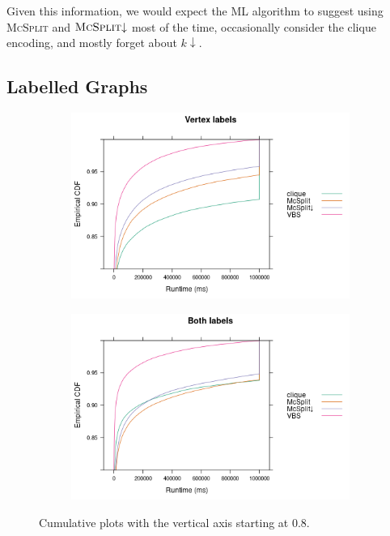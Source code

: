 \documentclass{l4proj}
\theoremstyle{definition}
\theoremstyle{remark}
\begin{document}
Given this information, we would expect the ML algorithm to suggest using
\textsc{McSplit} and $\textsc{McSplit}{\downarrow}$ most of the time, occasionally
consider the clique encoding, and mostly forget about $k{\downarrow}$.

\subsection{Labelled Graphs} \label{sec:labelled_runtimes}

\begin{figure}
  \centering
  \begin{subfigure}[t]{0.49\textwidth}
    \centering
    \includegraphics[width=\textwidth]{images/ecdf_vertex_labels.png}
  \end{subfigure}
  \begin{subfigure}[t]{0.49\textwidth}
    \centering
    \includegraphics[width=\textwidth]{images/ecdf_both_labels.png}
  \end{subfigure}
  \caption{Cumulative plots with the vertical axis starting at 0.8.}
  \label{fig:ecdfs}
\end{figure}
\end{document}
